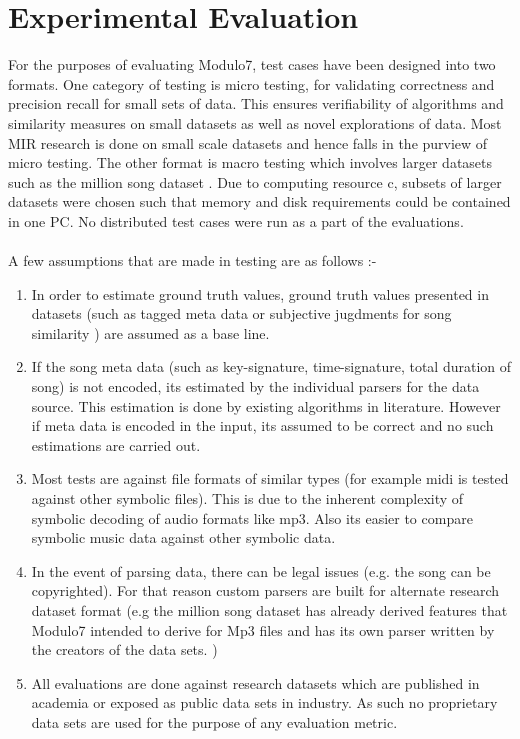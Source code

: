 \chapter{Experimental Evaluation}

\noindent For the purposes of evaluating Modulo7, test cases have been designed into two formats. One category of testing is micro testing, for validating correctness and precision recall for small sets of data. This ensures verifiability of algorithms and similarity measures on small datasets as well as novel explorations of data. Most MIR research is done on small scale datasets and hence falls in the purview of micro testing. The other format is macro testing which involves larger datasets such as the million song dataset \cite{msd}. Due to computing resource c, subsets of larger datasets were chosen such that memory and disk requirements could be  contained in one PC. No distributed test cases were run as a part of the evaluations. \\\\
A few assumptions that are made in testing are as follows :-
\begin{enumerate}
\item In order to estimate ground truth values, ground truth values presented in datasets (such as tagged meta data or subjective jugdments for song similarity ) are assumed as a base line.
\item If the song meta data (such as key-signature, time-signature, total duration of song) is not encoded, its estimated by the individual parsers for the data source. This estimation is done by existing algorithms in literature. However if meta data is encoded in the input, its assumed to be correct and no such estimations are carried out. 
\item Most tests are against file formats of similar types (for example midi is tested against other symbolic files). This is due to the inherent complexity of symbolic decoding of audio formats like mp3. Also its easier to compare symbolic music data against other symbolic data.
\item In the event of parsing data, there can be legal issues (e.g. the song can be copyrighted). For that reason custom parsers are built for alternate research dataset format (e.g the million song dataset has already derived features that Modulo7 intended to derive for Mp3 files and has its own parser written by the creators of the data sets. \cite{msd})
\item All evaluations are done against research datasets which are published in academia or exposed as public data sets in industry. As such no proprietary data sets are used for the purpose of any evaluation metric.
\end{enumerate}

